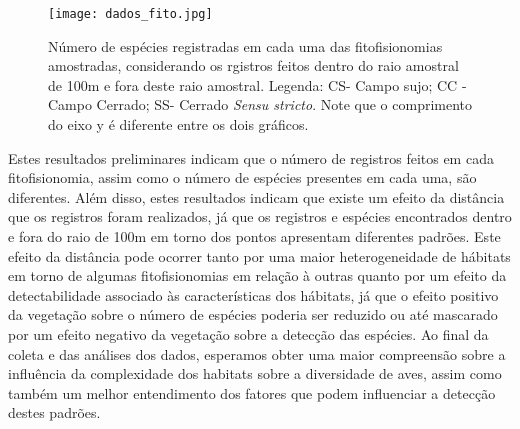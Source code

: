 \begin{figure}[hbtp]
\centering
\texttt{[image: dados\_fito.jpg]}
\caption{Número de espécies registradas em cada uma das fitofisionomias amostradas, considerando os rgistros feitos dentro do raio amostral de 100m e fora deste raio amostral. Legenda: CS- Campo sujo; CC -  Campo Cerrado; SS- Cerrado \textit{Sensu stricto}. Note que o comprimento do eixo y é diferente entre os dois gráficos.}

\label{fig:Figura 3} 
\end{figure}

Estes resultados preliminares indicam que o número de registros feitos em cada fitofisionomia, assim como o número de espécies presentes em cada uma, são diferentes. Além disso, estes resultados indicam que existe um efeito da distância que os registros foram realizados, já que os registros e espécies encontrados dentro e fora do raio de 100m em torno dos pontos apresentam diferentes padrões. Este efeito da distância pode ocorrer tanto por uma maior heterogeneidade de hábitats em torno de algumas fitofisionomias em relação à outras quanto por um efeito da detectabilidade associado às características dos hábitats, já que o efeito positivo da vegetação sobre o número de espécies poderia ser reduzido ou até mascarado por um efeito negativo da vegetação sobre a detecção das espécies. Ao final da coleta e das análises dos dados, esperamos obter uma maior compreensão sobre a influência da complexidade dos habitats sobre a diversidade de aves, assim como também um melhor entendimento dos fatores que podem influenciar a detecção destes padrões.